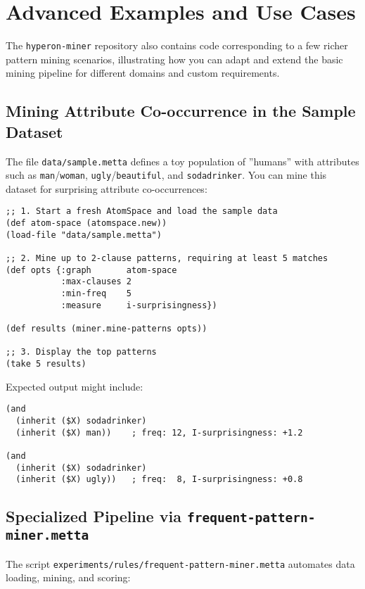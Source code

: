 \section{Advanced Examples and Use Cases}

The \texttt{hyperon-miner} repository also contains code corresponding to a few richer pattern mining scenarios, illustrating how you can adapt and extend the basic mining pipeline for different domains and custom requirements.

\subsection{Mining Attribute Co-occurrence in the Sample Dataset}

The file \texttt{data/sample.metta} defines a toy population of ''humans'' with attributes such as \texttt{man}/\texttt{woman}, \texttt{ugly}/\texttt{beautiful}, and \texttt{sodadrinker}.  You can mine this dataset for surprising attribute co-occurrences:

\begin{verbatim}
;; 1. Start a fresh AtomSpace and load the sample data
(def atom-space (atomspace.new))
(load-file "data/sample.metta")

;; 2. Mine up to 2-clause patterns, requiring at least 5 matches
(def opts {:graph       atom-space
           :max-clauses 2
           :min-freq    5
           :measure     i-surprisingness})

(def results (miner.mine-patterns opts))

;; 3. Display the top patterns
(take 5 results)
\end{verbatim}

Expected output might include:

\begin{verbatim}
(and 
  (inherit ($X) sodadrinker)
  (inherit ($X) man))    ; freq: 12, I-surprisingness: +1.2

(and 
  (inherit ($X) sodadrinker)
  (inherit ($X) ugly))   ; freq:  8, I-surprisingness: +0.8
\end{verbatim}

\subsection{Specialized Pipeline via \texttt{frequent-pattern-miner.metta}}

The script \texttt{experiments/rules/frequent-pattern-miner.metta} automates data loading, mining, and scoring:

